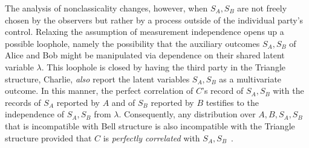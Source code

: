 \documentclass[aps, 10pt, english, twoside, pra, nofootinbib, tightenlines, longbibliography, superscriptaddress]{revtex4-1}
\begin{document}
    The analysis of nonclassicality changes, however, when $S_{A}, S_{B}$ are not freely chosen by the observers but rather by a process outside of the individual party's control. Relaxing the assumption of measurement independence opens up a possible loophole, namely the possibility that the auxiliary outcomes $S_{A}, S_{B}$ of Alice and Bob might be manipulated via dependence on their shared latent variable $\lambda$. This loophole is closed by having the third party in the Triangle structure, Charlie, \emph{also} report the latent variables $S_{A}, S_{B}$ as a multivariate outcome. In this manner, the perfect correlation of $C$'s record of $S_{A}, S_{B}$ with the records of $S_{A}$ reported by $A$ and of $S_{B}$ reported by $B$ testifies to the independence of $S_{A}, S_{B}$ from $\lambda$. Consequently, any distribution over $A, B, S_{A}, S_{B}$ that is incompatible with Bell structure is also incompatible with the Triangle structure provided that $C$ is \textit{perfectly correlated} with $S_{A}, S_{B}$~\cite{Fritz_2012}.
\end{document}
